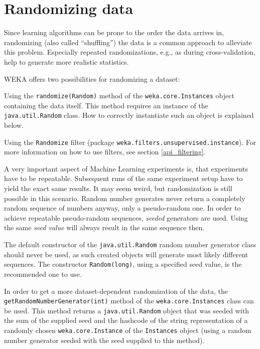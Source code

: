 \newpage
\section{Randomizing data}
\label{api_randomizing_data}
Since learning algorithms can be prone to the order the data arrives
in, randomizing (also called ``shuffling'') the data is a common approach to
alleviate this problem. Especially repeated randomizations, e.g., as during
cross-validation, help to generate more realistic statistics.

WEKA offers two possibilities for randomizing a dataset:
\begin{tight_itemize}
	\item Using the \texttt{randomize(Random)} method of the
\texttt{weka.core.Instances} object containing the data itself. This method
requires an instance of the \texttt{java.util.Random} class. How to correctly
instantiate such an object is explained below.
	\item Using the \texttt{Randomize} filter (package
\texttt{weka.filters.unsupervised.instance}). For more information on how to
use filters, see section \ref{api_filtering}.
\end{tight_itemize}
A very important aspect of Machine Learning experiments is, that experiments
have to be repeatable. Subsequent runs of the same experiment setup have to
yield the exact same results. It may seem weird, but randomization is still
possible in this scenario. Random number generates never return a completely
random sequence of numbers anyway, only a pseudo-random one. In order to
achieve repeatable pseudo-random sequences, \textit{seeded} generators are
used. Using the same \textit{seed value} will always result in the same
sequence then.

The default constructor of the \texttt{java.util.Random} random number generator
class should never be used, as such created objects will generate most likely
different sequences. The constructor \texttt{Random(long)}, using a specified 
seed value, is the recommended one to use.

In order to get a more dataset-dependent randomization of the data, the
\texttt{getRandomNumberGenerator(int)} method of the
\texttt{weka.core.Instances} class can be used. This method returns a
\texttt{java.util.Random} object that was seeded with the sum of the supplied
seed and the hashcode of the string representation of a randomly chosen
\texttt{weka.core.Instance} of the \texttt{Instances} object (using a random
number generator seeded with the seed supplied to this method).


